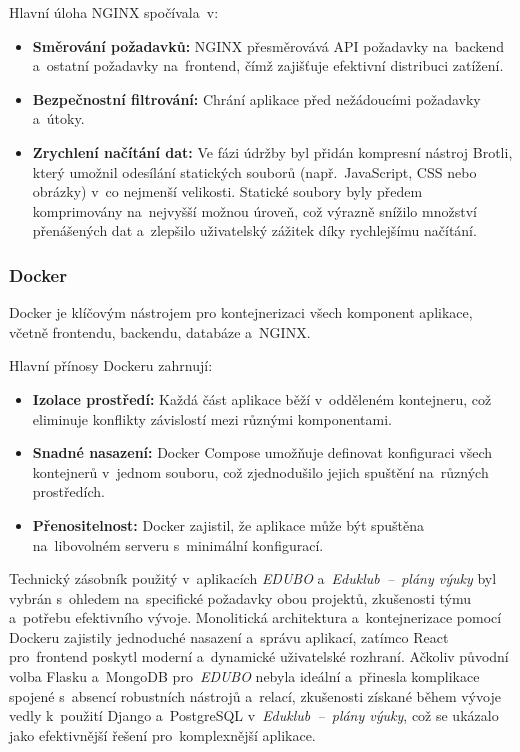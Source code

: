 \documentclass[male,czech,api_bc]{kitheses}
\begin{document}
Hlavní úloha NGINX spočívala~v:
\begin{itemize}
	\item \textbf{Směrování požadavků:} NGINX přesměrovává API požadavky na~backend a~ostatní požadavky na~frontend, čímž zajišťuje efektivní distribuci zatížení.
	\item \textbf{Bezpečnostní filtrování:} Chrání aplikace před nežádoucími požadavky a~útoky.
	\item \textbf{Zrychlení načítání dat:} Ve fázi údržby byl přidán kompresní nástroj Brotli, který umožnil odesílání statických souborů (např.~JavaScript, CSS nebo obrázky) v~co nejmenší velikosti. Statické soubory byly předem komprimovány na~nejvyšší možnou úroveň, což výrazně snížilo množství přenášených dat a~zlepšilo uživatelský zážitek díky rychlejšímu načítání.
\end{itemize}

\subsubsection{Docker}

Docker je klíčovým nástrojem pro kontejnerizaci všech komponent aplikace, včetně frontendu, backendu, databáze a~NGINX.

Hlavní přínosy Dockeru zahrnují:
\begin{itemize}
	\item \textbf{Izolace prostředí:} Každá část aplikace běží v~odděleném kontejneru, což eliminuje konflikty závislostí mezi různými komponentami.
	\item \textbf{Snadné nasazení:} Docker Compose umožňuje definovat konfiguraci všech kontejnerů v~jednom souboru, což zjednodušilo jejich spuštění na~různých prostředích.
	\item \textbf{Přenositelnost:} Docker zajistil, že aplikace může být spuštěna na~libovolném serveru s~minimální konfigurací.
\end{itemize}

Technický zásobník použitý v~aplikacích \textit{EDUBO} a~\textit{Eduklub~--~plány výuky} byl vybrán s~ohledem na~specifické požadavky obou projektů, zkušenosti týmu a~potřebu efektivního vývoje. Monolitická architektura a~kontejnerizace pomocí Dockeru zajistily jednoduché nasazení a~správu aplikací, zatímco React pro~frontend poskytl moderní a~dynamické uživatelské rozhraní. Ačkoliv původní volba Flasku a~MongoDB pro~\textit{EDUBO} nebyla ideální a~přinesla komplikace spojené s~absencí robustních nástrojů a~relací, zkušenosti získané během vývoje vedly k~použití Django a~PostgreSQL v~\textit{Eduklub~--~plány výuky}, což se ukázalo jako efektivnější řešení pro~komplexnější aplikace.
\end{document}
